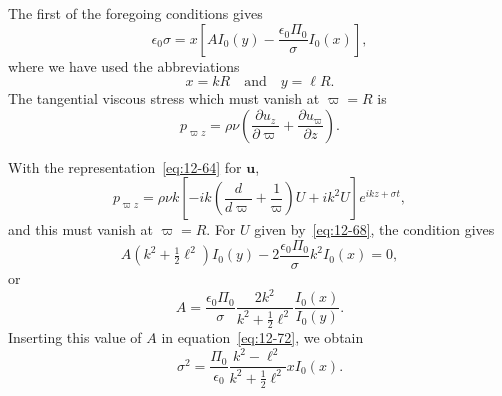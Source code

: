 The first of the foregoing conditions gives
\begin{equation}
\label{eq:12-72}
\epsilon_0 \sigma = x\left[A I_0(y) - \frac{\epsilon_0 \Pi_0}{\sigma} I_0(x)\right],
\end{equation}
where we have used the abbreviations
\begin{equation}
\label{eq:12-73}
x = kR \quad \text{and} \quad y = \ell R.
\end{equation}
The tangential viscous stress which must vanish at $\varpi = R$ is
\begin{equation}
\label{eq:12-74}
p_{\varpi z} = \rho\nu\left(\frac{\partial u_z}{\partial \varpi} + \frac{\partial u_\varpi}{\partial z}\right).
\end{equation}

With the representation~\eqref{eq:12-64} for $\mathbf{u}$,
\begin{equation}
\label{eq:12-75}
p_{\varpi z} = \rho\nu k \left[-ik\left(\frac{d}{d\varpi} + \frac{1}{\varpi}\right)U + ik^2 U\right] e^{ikz+\sigma t},
\end{equation}
and this must vanish at $\varpi = R$. For $U$ given by~\eqref{eq:12-68}, the condition gives
\begin{equation}
\label{eq:12-76}
A(k^2 + \tfrac{1}{2}\ell^2) I_0(y) - 2\frac{\epsilon_0 \Pi_0}{\sigma} k^2 I_0(x) = 0,
\end{equation}
or
\begin{equation}
\label{eq:12-77}
A = \frac{\epsilon_0 \Pi_0}{\sigma} \frac{2k^2}{k^2 + \frac{1}{2}\ell^2} \frac{I_0(x)}{I_0(y)}.
\end{equation}
Inserting this value of $A$ in equation~\eqref{eq:12-72}, we obtain
\begin{equation}
\label{eq:12-78}
\sigma^2 = \frac{\Pi_0}{\epsilon_0} \frac{k^2 - \ell^2}{k^2 + \frac{1}{2}\ell^2} x I_0(x).
\end{equation}


